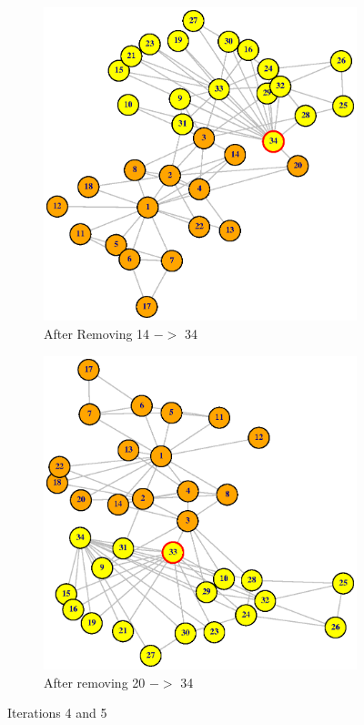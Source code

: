 \documentclass[12pt,letterpaper]{article}
\begin{document}
%
\begin{figure}
\centering
\begin{subfigure}{.5\textwidth}
  \centering
  \includegraphics[width=.9\linewidth]{Plot5}
  \caption{After Removing 14 $->$ 34 }
  \label{fig:sub1}
\end{subfigure}%
\begin{subfigure}{.5\textwidth}
  \centering
  \includegraphics[width=.9\linewidth]{Plot6}
  \caption{After removing 20 $->$ 34}
  \label{fig:sub2}
\end{subfigure}
\caption{Iterations 4 and 5}
\label{fig:test}
\end{figure}
\end{document}
